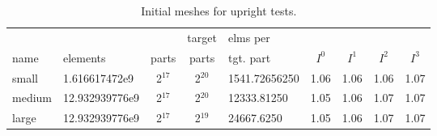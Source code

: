 \begin{table} [htpb] \centering
  \footnotesize
  \caption{Initial meshes for upright tests.}
  \label{tbl:upMeshes}
  \begin{tabular}
    {l        E{2}{1}{1}      c          c              F{6}{1}              c         c         c         c }
           &                  &          & target       & {elms per}    &         &         &         & \\
    name   & {elements}       & parts    & parts        & {tgt. part}   & $I^{0}$ & $I^{1}$ & $I^{2}$ & $I^{3}$\\
    \hline
    small  & 1.616617472e9  & 2$^{17}$ & 2$^{20}$     & 1541.72656250 & 1.06    & 1.06    & 1.06    & 1.07  \\
    medium & 12.932939776e9 & 2$^{17}$ & 2$^{20}$     & 12333.81250   & 1.05    & 1.06    & 1.07    & 1.07  \\
    large  & 12.932939776e9 & 2$^{17}$ & 2$^{19}$     & 24667.6250    & 1.05    & 1.06    & 1.07    & 1.07
  \end{tabular}
\end{table}

